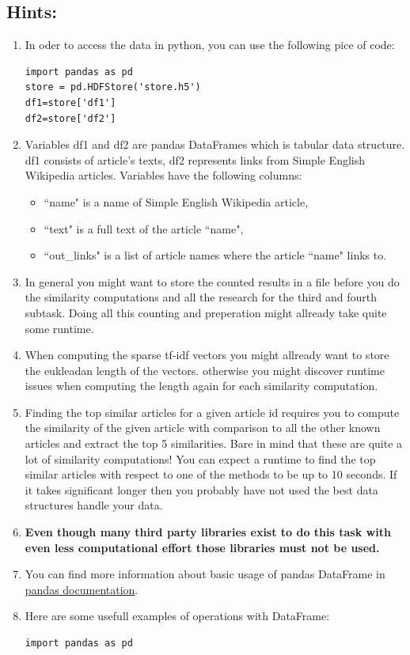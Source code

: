 \documentclass{WeSTassignment}
\begin{document}
\subsection{Hints:}
\begin{enumerate}
\item In oder to access the data in python, you can use the following pice of code:
\begin{lstlisting}
import pandas as pd
store = pd.HDFStore('store.h5')
df1=store['df1'] 
df2=store['df2'] 
\end{lstlisting}
\item Variables df1 and df2 are pandas DataFrames which is tabular data structure. df1 consists of article's texts, df2 represents links from Simple English Wikipedia articles. Variables have the following columns:
\begin{itemize}
\item ``name" is a name of Simple English Wikipedia article,
\item ``text" is a full text of the article ``name",
\item ``out\_links" is a list of article names where the article ``name" links to.
\end{itemize}
\item In general you might want to store the counted results in a file before you do the similarity computations and all the research for the third and fourth subtask. Doing all this counting and preperation might allready take quite some runtime. 
\item When computing the sparse tf-idf vectors you might allready want to store the eukleadan length of the vectors. otherwise you might discover runtime issues when computing the length again for each similarity computation. 
\item Finding the top similar articles for a given article id requires you to compute the similarity of the given article with comparison to all the other known articles and extract the top 5 similarities. Bare in mind that these are quite a lot of similarity computations! You can expect a runtime to find the top similar articles with respect to one of the methods to be up to 10 seconds. If it takes significant longer then you probably have not used the best data structures handle your data.
\item \textbf{Even though many third party libraries exist to do this task with even less computational effort those libraries must not be used.}
\item You can find more information about basic usage of pandas DataFrame in  \href{http://pandas.pydata.org/pandas-docs/stable/dsintro.html#column-selection-addition-deletion}{pandas documentation}.
\item Here are some usefull examples of operations with DataFrame:
\begin{lstlisting} 
import pandas as pd


\end{lstlisting}
\end{enumerate}
\end{document}
